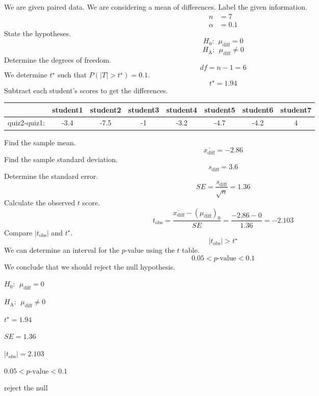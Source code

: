 \begin{solution}
We are given paired data. We are considering a mean of differences.
Label the given information. \[
\begin{aligned}
n &= 7 \\
\alpha &= 0.1
\end{aligned}
\] State the hypotheses. \[H_0: ~~\mu_\text{diff}=0\]
\[H_\text{A}: ~~\mu_\text{diff}\ne0\] Determine the degrees of freedom.
\[df = n-1 = 6 \] We determine \(t^\star\) such that
\(P(|T|>t^\star) = 0.1\). \[t^\star = 1.94 \] Subtract each student's
scores to get the differences.

\begin{longtable}[]{@{}cccccccc@{}}
\toprule
& student1 & student2 & student3 & student4 & student5 & student6 &
student7\tabularnewline
\midrule
\endhead
quiz2-quiz1: & -3.4 & -7.5 & -1 & -3.2 & -4.7 & -4.2 & 4\tabularnewline
\bottomrule
\end{longtable}

Find the sample mean. \[\overline{x_\text{diff}} = -2.86\] Find the
sample standard deviation. \[s_\text{diff} = 3.6\] Determine the
standard error. \[SE = \frac{s_\text{diff}}{\sqrt{n}} = 1.36 \]
Calculate the observed \(t\) score.
\[t_\text{obs} = \frac{\overline{x_\text{diff}}-(\mu_\text{diff})_0}{SE} = \frac{-2.86-0}{1.36} = -2.103 \]
Compare \(|t_\text{obs}|\) and \(t^\star\).
\[|t_\text{obs}| > t^\star \] We can determine an interval for the
\(p\)-value using the \(t\) table. \[0.05 < p\text{-value} < 0.1\] We
conclude that we should reject the null hypothesis.
\begin{answerlist}
  \item \(H_0: ~~\mu_\text{diff}=0\)
  \item \(H_\text{A}:~~ \mu_\text{diff} \ne 0\)
  \item \(t^\star = 1.94\)
  \item \(SE = 1.36\)
  \item \(|t_\text{obs}| = 2.103\)
  \item \(0.05 < p\text{-value} < 0.1\)
  \item reject the null
\end{answerlist}
\end{solution}

